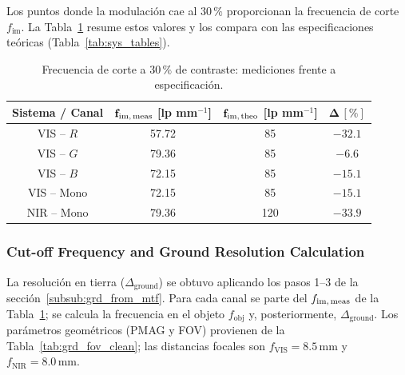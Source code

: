     Los puntos donde la modulación cae al \(30\,\%\) proporcionan la frecuencia de corte \(f_{\text{im}}\).  
    La Tabla~\ref{tab:cutoff_meas} resume estos valores y los compara con las especificaciones teóricas (Tabla~\ref{tab:sys_tables}).

    \begin{table}[H]
        \centering
        \caption{Frecuencia de corte a \(30\,\%\) de contraste: mediciones frente a especificación.}
        \label{tab:cutoff_meas}
        \begin{tabular}{|c|c|c|c|}
            \hline
            \rowcolor[HTML]{EFEFEF}
            \textbf{Sistema / Canal} &
            \(\mathbf{f_{\text{im,\,meas}}}\) [lp mm\(^{-1}\)] &
            \(\mathbf{f_{\text{im,\,theo}}}\) [lp mm\(^{-1}\)] &
            \(\mathbf{\Delta\,[\%]}\) \\ \hline
            VIS – \(R\)     &  57.72 & 85  & \(-32.1\) \\ \hline
            VIS – \(G\)     &  79.36 & 85  &  \(-6.6\) \\ \hline
            VIS – \(B\)     &  72.15 & 85  & \(-15.1\) \\ \hline
            VIS – Mono      &  72.15 & 85  & \(-15.1\) \\ \hline
            NIR – Mono      &  79.36 & 120 & \(-33.9\) \\ \hline
        \end{tabular}
    \end{table}

    \subsubsection{Cut-off Frequency and Ground Resolution Calculation}
    \label{subsub:grd_calc}
    La resolución en tierra (\(\Delta_{\text{ground}}\)) se obtuvo aplicando los pasos 1–3 de la sección~\ref{subsub:grd_from_mtf}.  
    Para cada canal se parte del \(f_{\text{im,\,meas}}\) de la Tabla~\ref{tab:cutoff_meas}; se calcula la frecuencia en el objeto
    $f_{\text{obj}}$ y, posteriormente,
    $\Delta_{\text{ground}}$.  
    Los parámetros geométricos (PMAG y FOV) provienen de la Tabla~\ref{tab:grd_fov_clean}; las distancias focales son
    \(f_{\text{VIS}} = 8.5\,\mathrm{mm}\) y \(f_{\text{NIR}} = 8.0\,\mathrm{mm}\).

